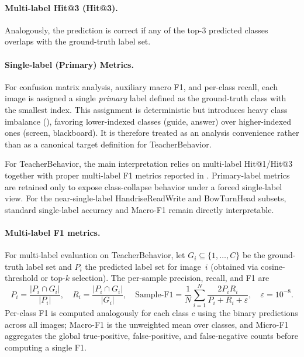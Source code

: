\documentclass[symmetry,article,submit,pdftex,moreauthors]{Definitions/mdpi}
\begin{document}
\paragraph{Multi-label Hit@3 (Hit@3).}
Analogously, the prediction is correct if any of the top-3 predicted classes overlaps with the ground-truth label set.

\paragraph{Single-label (Primary) Metrics.}
For confusion matrix analysis, auxiliary macro F1, and per-class recall, each image is assigned a single \emph{primary} label defined as the ground-truth class with the smallest index.
This assignment is deterministic but introduces heavy class imbalance (), favoring lower-indexed classes (guide, answer) over higher-indexed ones (screen, blackboard). It is therefore treated as an analysis convenience rather than as a canonical target definition for TeacherBehavior.

For TeacherBehavior, the main interpretation relies on multi-label Hit@1/Hit@3 together with proper multi-label F1 metrics reported in . Primary-label metrics are retained only to expose class-collapse behavior under a forced single-label view. For the near-single-label HandriseReadWrite and BowTurnHead subsets, standard single-label accuracy and Macro-F1 remain directly interpretable.

\paragraph{Multi-label F1 metrics.}
For multi-label evaluation on TeacherBehavior, let $G_i \subseteq \{1,\dots,C\}$ be the ground-truth label set and $P_i$ the predicted label set for image~$i$ (obtained via cosine-threshold or top-$k$ selection). The per-sample precision, recall, and F1 are
\begin{equation}
P_i = \frac{|P_i \cap G_i|}{|P_i|},\quad
R_i = \frac{|P_i \cap G_i|}{|G_i|},\quad
\text{Sample-F1} = \frac{1}{N}\sum_{i=1}^{N} \frac{2 P_i R_i}{P_i + R_i + \varepsilon},\quad \varepsilon=10^{-8}.
\end{equation}
Per-class F1 is computed analogously for each class $c$ using the binary predictions across all images; Macro-F1 is the unweighted mean over classes, and Micro-F1 aggregates the global true-positive, false-positive, and false-negative counts before computing a single F1.
\end{document}
